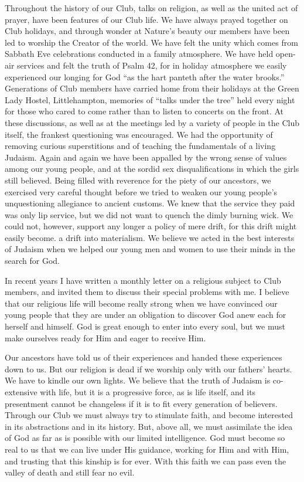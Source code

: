 Throughout the history of our Club, talks on religion,
as well as the united act of prayer, have been features of
our Club life. We have always prayed together on Club
holidays, and through wonder at Nature’s beauty our
members have been led to worship the Creator of the
world. We have felt the unity which comes from
Sabbath Eve celebrations conducted in a family atmosphere.
We have held open-air services and felt the truth
of Psalm 42, for in holiday atmosphere we easily experienced
our longing for God “as the hart panteth after the
water brooks.” Generations of Club members have
carried home from their holidays at the Green Lady
Hostel, Littlehampton, memories of “talks under the
tree” held every night for those who cared to come
rather than to listen to concerts on the front. At these
discussions, as well as at the meetings led by a variety of
people in the Club itself, the frankest questioning was
encouraged. We had the opportunity of removing curious
superstitions and of teaching the fundamentals of a living
Judaism. Again and again we have been appalled by
the wrong sense of values among our young people, and
at the sordid sex disqualifications in which the girls still
believed. Being filled with reverence for the piety of our
ancestors, we exercised very careful thought before we
tried to weaken our young people’s unquestioning allegiance
to ancient customs. We knew that the service they
paid was only lip service, but we did not want to quench
the dimly burning wick. We could not, however, support
any longer a policy of mere drift, for this drift might
easily become. a drift into materialism. We believe we
acted in the best interests of Judaism when we helped our
young men and women to use their minds in the search
for God.

In recent years I have written a monthly letter on a
religious subject to Club members, and invited them to
discuss their special problems with me. I believe that
our religious life will become really strong when we have
convinced our young people that they are under an
obligation to discover God anew each for herself and himself.
God is great enough to enter into every soul, but we
must make ourselves ready for Him and eager to receive
Him.

Our ancestors have told us of their experiences and
handed these experiences down to us. But our religion is
dead if we worship only with our fathers’ hearts. We
have to kindle our own lights. We believe that the truth
of Judaism is co-extensive with life, but it is a progressive
force, as is life itself, and its presentment cannot be
changeless if it is to fit every generation of believers.
Through our Club we must always try to stimulate faith,
and become interested in its abstractions and in its history.
But, above all, we must assimilate the idea of God as far as
is possible with our limited intelligence. God must
become so real to us that we can live under His guidance,
working for Him and with Him, and trusting that this
kinship is for ever. With this faith we can pass even the
valley of death and still fear no evil.
